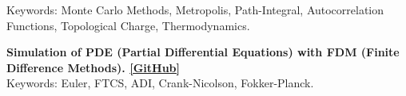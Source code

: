 \begin{cventries}
{\begin{cvitemss}
        Keywords: Monte Carlo Methods, Metropolis, Path-Integral, Autocorrelation Functions, Topological Charge, Thermodynamics.\\
        \item {\textbf{Simulation of PDE (Partial Differential Equations) with FDM (Finite Difference Methods).
        \href{https://github.com/RaffaeleParadiso/PDE}{[GitHub]}\\}}
        Keywords: Euler, FTCS, ADI, Crank-Nicolson, Fokker-Planck.\\
      \end{cvitemss}
    }
    \vspace{-2.4mm}
\end{cventries}
